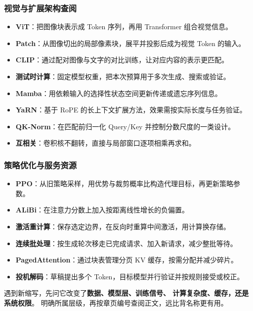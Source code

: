 \subsubsection*{视觉与扩展架构查阅}
\begin{itemize}
\item \textbf{ViT}：把图像块表示成 Token 序列，再用 Transformer 组合视觉信息。 
\item \textbf{Patch}：从图像切出的局部像素块，展平并投影后成为视觉 Token 的输入。 
\item \textbf{CLIP}：通过配对图像与文字的对比训练，让对应内容的表示更匹配。 
\item \textbf{测试时计算}：固定模型权重，把本次预算用于多次生成、搜索或验证。 
\item \textbf{Mamba}：用依赖输入的选择性状态空间更新传递或遗忘序列信息。 
\item \textbf{YaRN}：基于 RoPE 的长上下文扩展方法，效果需按实际长度与任务验证。 
\item \textbf{QK-Norm}：在匹配前归一化 Query/Key 并控制分数尺度的一类设计。 
\item \textbf{互相关}：卷积核不翻转，直接与局部窗口逐项相乘再求和。 
\end{itemize}

\subsubsection*{策略优化与服务资源}
\begin{itemize}
\item \textbf{PPO}：从旧策略采样，用优势与裁剪概率比构造代理目标，再更新策略参数。 
\item \textbf{ALiBi}：在注意力分数上加入按距离线性增长的负偏置。 
\item \textbf{激活重计算}：保存选定边界，在反向时重算中间激活，用计算换存储。 
\item \textbf{连续批处理}：按生成轮次移走已完成请求、加入新请求，减少整批等待。 
\item \textbf{PagedAttention}：通过块表管理分页 KV 缓存，按需分配并减少碎片。 
\item \textbf{投机解码}：草稿提出多个 Token，目标模型并行验证并按规则接受或校正。 
\end{itemize}

\par\smallskip
遇到新缩写，先问它改变了\textbf{数据、模型层、训练信号、
计算复杂度、缓存，还是系统权限}。
明确所属层级，再按章页编号查阅正文，远比背名称更有用。
